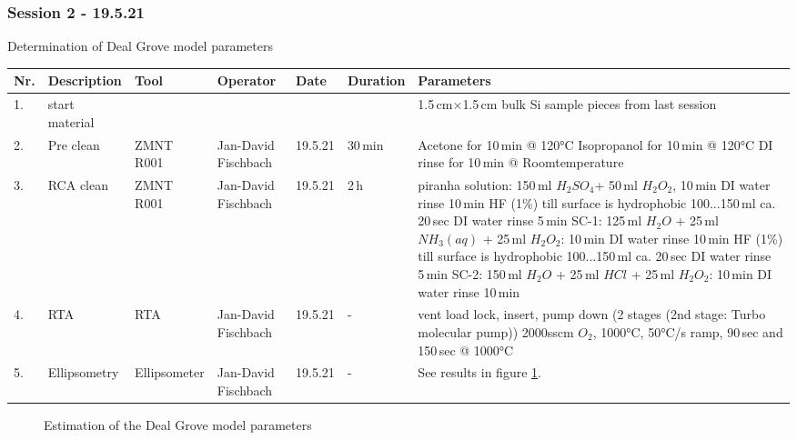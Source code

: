 \newpage
\vspace{-0.1cm}   
\subsubsection*{Session 2 - 19.5.21}   
Determination of Deal Grove model parameters  
\vspace{-0.5cm}   
\begin{table}[H]
\footnotesize
\begin{tabular}{| p{0.4cm}| p{2.8cm}| p{2.0cm}|p{2.0cm}| p{2.0cm}| p{2.0cm}|p{13.5cm}|}
\hline
\textbf{Nr.}&\textbf{Description}  &\textbf{Tool}&\textbf{Operator}&\textbf{Date}  &\textbf{Duration}       &        \textbf{Parameters}\\ \hline\hline
1. &start material&   &   &  &  & 1.5\,cm$\times$1.5\,cm bulk Si sample pieces from last session\\\hline
2. &Pre clean& ZMNT R001 & Jan-David Fischbach & 19.5.21 & 30\,min & 
Acetone for 10\,min @ 120°C\newline
Isopropanol for 10\,min @ 120°C\newline
DI rinse for 10\,min @ Roomtemperature\\\hline
3. &RCA clean& ZMNT R001 & Jan-David Fischbach & 19.5.21 & 2\,h & 
piranha solution: 150\,ml $H_2SO_4$+ 50\,ml $H_2O_2$, 10\,min\newline
DI water rinse 10\,min\newline
HF (1\%) till surface is hydrophobic 100...150\,ml ca. 20\,sec\newline
DI water rinse 5\,min\newline
SC-1: 125\,ml $H_2O$ + 25\,ml $NH_3(aq)$ + 25\,ml $H_2O_2$: 10\,min\newline
DI water rinse 10\,min\newline
HF (1\%) till surface is hydrophobic 100...150\,ml ca. 20\,sec\newline
DI water rinse 5\,min\newline
SC-2: 150\,ml $H_2O$ + 25\,ml $HCl$ + 25\,ml $H_2O_2$: 10\,min\newline
DI water rinse 10\,min\\\hline
4. &RTA& RTA & Jan-David Fischbach & 19.5.21 & - & 
vent load lock, insert, pump down (2 stages (2nd stage: Turbo molecular pump))\newline
2000sscm $O_2$, 1000°C, 50°C/s ramp, 90\,sec and 150\,sec @ 1000°C\\\hline
5. &Ellipsometry& Ellipsometer & Jan-David Fischbach & 19.5.21 & - & 
See results in figure \ref{fig:dealgrove}.\\\hline
\end{tabular}
\end{table}  
\vspace{-0.5cm}   

\graphicspath{{Assets}}
\begin{figure}[H]
  \centering
      \def\svgwidth{0.3\columnwidth}
      
      \caption{Estimation of the Deal Grove model parameters}
      \label{fig:dealgrove}
\end{figure}